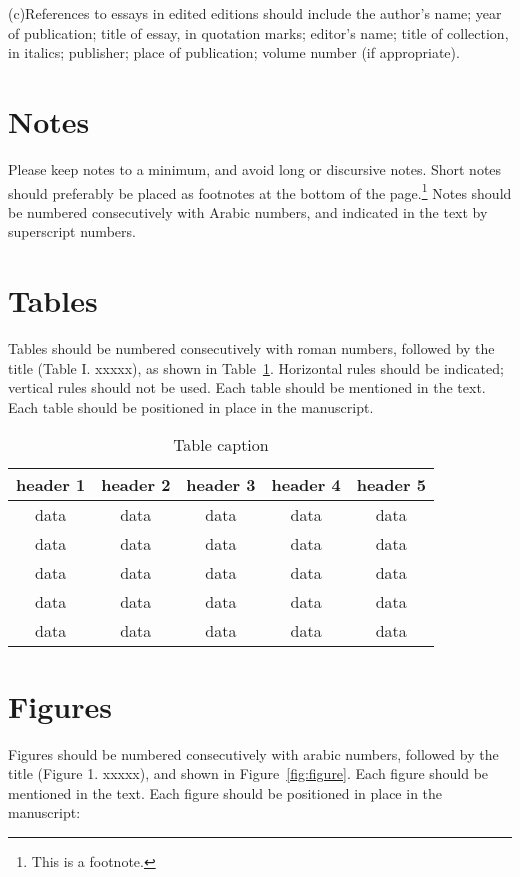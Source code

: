 \documentclass{ecscw2007}
\begin{document}
(c)References to essays in edited editions should include the author's
name; year of publication; title of essay, in quotation marks;
editor's name; title of collection, in italics; publisher; place of
publication; volume number (if appropriate).



\section*{Notes}
 
Please keep notes to a minimum, and avoid long or discursive notes.
Short notes should preferably be placed as footnotes at the bottom of
the page.\footnote{This is a footnote.} Notes should be numbered
consecutively with Arabic numbers, and indicated in the text by
superscript numbers.


\section*{Tables} 

Tables should be numbered consecutively with roman numbers, followed
by the title (Table I. xxxxx), as shown in
Table~\ref{tab:sample}. Horizontal rules should be indicated; vertical
rules should not be used. Each table should be mentioned in the
text. Each table should be positioned in place in the manuscript.

\begin{table}[htb]
  \caption{Table caption}\vspace{1ex}
  \label{tab:sample}
  \centering
  \begin{tabular}{ccccc}
    \hline 
    header 1 & header 2 & header 3 & header 4 & header 5 \\
    \hline  
    data & data & data & data & data \\
    data & data & data & data & data \\
    data & data & data & data & data \\
    data & data & data & data & data \\
    data & data & data & data & data \\
    \hline
  \end{tabular}
\end{table}

\section*{Figures} 

Figures should be numbered consecutively with arabic numbers, followed
by the title (Figure 1. xxxxx), and shown in
Figure~\ref{fig:figure}. Each figure should be mentioned in the
text. Each figure should be positioned in place in the manuscript:
\end{document}
